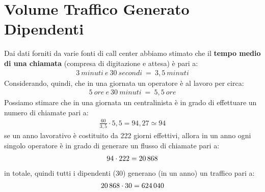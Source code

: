 \section[Volume Traffico Generato Dipendenti]{Volume Traffico Generato Dipendenti}
Dai dati forniti da varie fonti di call center abbiamo stimato che il \textbf{tempo medio di una chiamata} (compresa di digitazione e attesa) è pari a:
	\begin{equation}
	\label{eq:durata_media_chiamate}
	\begin{split}
		3 \: minuti \: e \: 30 \: secondi \: = \: 3,5 \: minuti  
	\end{split}
	\end{equation}
Considerando, quindi, che in una giornata un operatore è al lavoro per circa:
	\begin{equation}
	\label{eq:durata_orario_lavoro}
	\begin{split}
		5 \: ore \: e \: 30 \: minuti \: = \: 5,5 \: ore  
	\end{split}
	\end{equation}
Possiamo stimare che in una giornata un centralinista è in grado di effettuare un numero di chiamate pari a:
	\begin{equation}
	\label{eq:num_chiamate_singolo_operatore_giorno}
	\begin{split}
		\frac{60}{3,5} \cdot 5,5 = 94,27 \simeq 94 
	\end{split}
	\end{equation}
se un anno lavorativo è costituito da 222 giorni effettivi, allora in un anno ogni singolo operatore è in grado di generare un flusso di chiamate pari a:
	\begin{equation}
	\label{eq:num_chiamate_singolo_operatore_anno}
	\begin{split}
		94 \cdot 222 = 20\thinspace 868 
	\end{split}
	\end{equation}
in totale, quindi tutti i dipendenti (30) generano (in un anno) un traffico pari a:
	\begin{equation}
	\label{eq:num_chiamate_azienda_anno}
	\begin{split}
		20\thinspace 868 \cdot 30 = 624\thinspace 040 
	\end{split}
	\end{equation}
